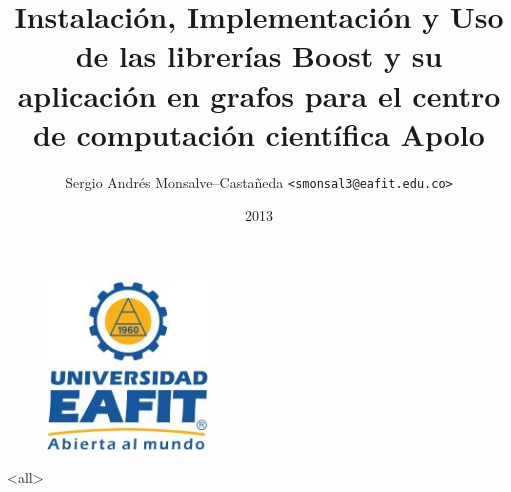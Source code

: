 \documentclass[ignorenonframetext]{beamer}
\title[Proyecto de Grado]{
  Instalación, Implementación y Uso de las librerías Boost y su aplicación en grafos para el centro de computación científica Apolo}
\author[]{Sergio Andrés Monsalve--Castañeda \texttt{<smonsal3@eafit.edu.co>}
}
\institute[Universidad EAFIT]{
}
\date[Universidad EAFIT]{2013}
\begin{document}
\begin{frame}
 \begin{figure}[htp]
	\centering
	\includegraphics[width=0.38\textwidth]{../aux/logo_EAFIT}
\end{figure}
\end{frame}


\begin{frame}
  \titlepage
\end{frame}


\mode<all>

\mode*

 
 
\end{document}
